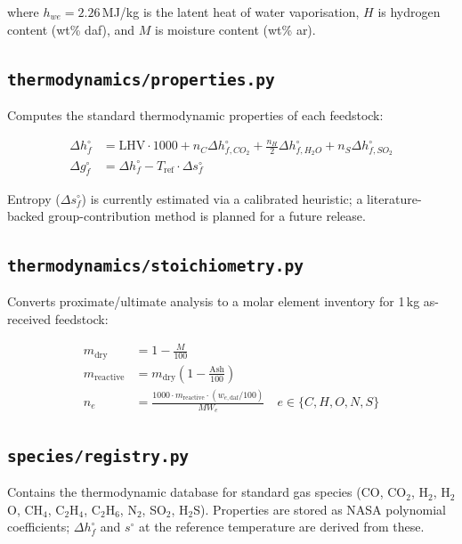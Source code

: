 \documentclass[12pt, a4paper]{article}
\begin{document}
where $h_{we} = 2.26$\,MJ/kg is the latent heat of water vaporisation, $H$ is hydrogen content (wt\% daf), and $M$ is moisture content (wt\% ar).

\subsection{\texttt{thermodynamics/properties.py}}

Computes the standard thermodynamic properties of each feedstock:

\begin{align}
    \Delta h_f^\circ &= \mathrm{LHV} \cdot 1000 + n_C \Delta h_{f,CO_2}^\circ + \tfrac{n_H}{2} \Delta h_{f,H_2O}^\circ + n_S \Delta h_{f,SO_2}^\circ \\
    \Delta g_f^\circ &= \Delta h_f^\circ - T_{\mathrm{ref}} \cdot \Delta s_f^\circ
\end{align}

Entropy ($\Delta s_f^\circ$) is currently estimated via a calibrated heuristic; a literature-backed group-contribution method is planned for a future release.

\subsection{\texttt{thermodynamics/stoichiometry.py}}

Converts proximate/ultimate analysis to a molar element inventory for 1\,kg as-received feedstock:

\begin{align}
    m_{\mathrm{dry}} &= 1 - \frac{M}{100} \\
    m_{\mathrm{reactive}} &= m_{\mathrm{dry}} \left(1 - \frac{\mathrm{Ash}}{100}\right) \\
    n_e &= \frac{1000 \cdot m_{\mathrm{reactive}} \cdot (w_{e,\mathrm{daf}}/100)}{MW_e} \quad e \in \{C,H,O,N,S\}
\end{align}

\subsection{\texttt{species/registry.py}}

Contains the thermodynamic database for standard gas species (CO, CO$_2$, H$_2$, H$_2$O, CH$_4$, C$_2$H$_4$, C$_2$H$_6$, N$_2$, SO$_2$, H$_2$S). Properties are stored as NASA polynomial coefficients; $\Delta h_f^\circ$ and $s^\circ$ at the reference temperature are derived from these.
\end{document}

